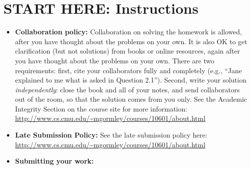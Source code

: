 \documentclass[11pt,addpoints,answers]{exam}
\numberwithin{equation}{section} %
\numberwithin{figure}{section} %
\numberwithin{table}{section} %
\begin{document}
\section*{START HERE: Instructions}
\begin{itemize}
\item \textbf{Collaboration policy:} Collaboration on solving the homework is allowed, after you have thought about the problems on your own. It is also OK to get clarification (but not solutions) from books or online resources, again after you have thought about the problems on your own. There are two requirements: first, cite your collaborators fully and completely (e.g., ``Jane explained to me what is asked in Question 2.1''). Second, write your solution {\em independently}: close the book and all of your notes, and send collaborators out of the room, so that the solution comes from you only.  See the Academic Integrity Section on the course site for more information: \url{http://www.cs.cmu.edu/~mgormley/courses/10601/about.html}

\item\textbf{Late Submission Policy:} See the late submission policy here: \url{http://www.cs.cmu.edu/~mgormley/courses/10601/about.html}

\item\textbf{Submitting your work:} 

\begin{itemize}



\end{itemize}
\end{itemize}
\end{document}
